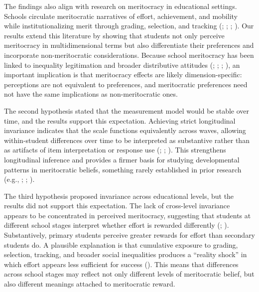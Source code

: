 \documentclass[
  13pt,
]{article}
\begin{document}
The findings also align with research on meritocracy in educational
settings. Schools circulate meritocratic narratives of effort,
achievement, and mobility while institutionalizing merit through
grading, selection, and tracking
(;
;
;
). Our results
extend this literature by showing that students not only perceive
meritocracy in multidimensional terms but also differentiate their
preferences and incorporate non-meritocratic considerations. Because
school meritocracy has been linked to inequality legitimation and
broader distributive attitudes
(;
;
;
), an
important implication is that meritocracy effects are likely
dimension-specific: perceptions are not equivalent to preferences, and
meritocratic preferences need not have the same implications as
non-meritocratic ones.

The second hypothesis stated that the measurement model would be stable
over time, and the results support this expectation. Achieving strict
longitudinal invariance indicates that the scale functions equivalently
across waves, allowing within-student differences over time to be
interpreted as substantive rather than as artifacts of item
interpretation or response use (; ; ). This strengthens longitudinal inference and
provides a firmer basis for studying developmental patterns in
meritocratic beliefs, something rarely established in prior research
(e.g., ;
;
).

The third hypothesis proposed invariance across educational levels, but
the results did not support this expectation. The lack of cross-level
invariance appears to be concentrated in perceived meritocracy,
suggesting that students at different school stages interpret whether
effort is rewarded differently
(;
).
Substantively, primary students perceive greater rewards for effort than
secondary students do. A plausible explanation is that cumulative
exposure to grading, selection, tracking, and broader social
inequalities produces a ``reality shock'' in which effort appears less
sufficient for success (). This means that differences across school stages may
reflect not only different levels of meritocratic belief, but also
different meanings attached to meritocratic reward.
\end{document}
